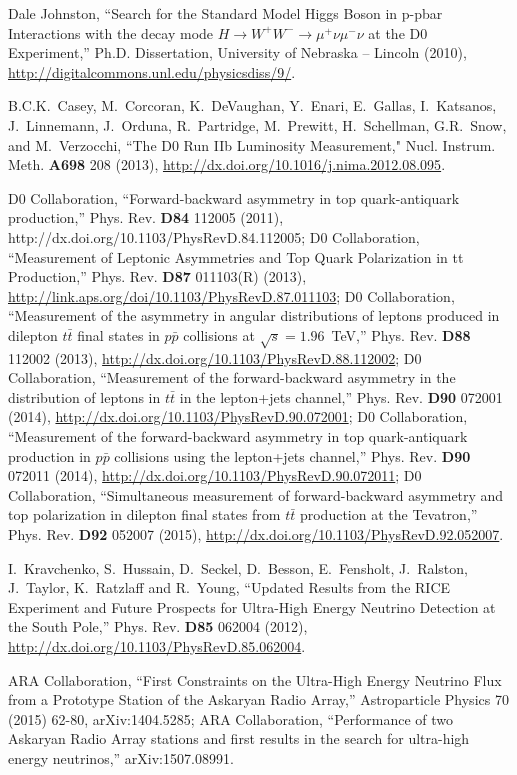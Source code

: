 \begin{thebibliography}{99}
Dale Johnston, ``Search for the Standard Model Higgs Boson in p-pbar Interactions with the decay mode $H\rightarrow W^+ W^- \rightarrow \mu^+ \nu \mu^- \nu$ at the D0 Experiment,'' Ph.D. Dissertation, University of Nebraska -- Lincoln (2010), \url{http://digitalcommons.unl.edu/physicsdiss/9/}.

 B.C.K.~Casey, M.~Corcoran, K.~DeVaughan, Y.~Enari, E.~Gallas, I.~Katsanos, J.~Linnemann, J.~Orduna, R.~Partridge, M.~Prewitt, H.~Schellman, G.R.~Snow, and M.~Verzocchi, ``The D0 Run IIb Luminosity Measurement," Nucl. Instrum. Meth. {\bf A698} 208 (2013), \url{http://dx.doi.org/10.1016/j.nima.2012.08.095}.

 D0 Collaboration, ``Forward-backward asymmetry in top quark-antiquark production,” Phys. Rev. {\bf D84} 112005 (2011), http://dx.doi.org/10.1103/PhysRevD.84.112005;
D0 Collaboration, ``Measurement of Leptonic Asymmetries and Top Quark Polarization in tt Production,'' Phys. Rev. {\bf D87} 011103(R) (2013), \url{http://link.aps.org/doi/10.1103/PhysRevD.87.011103};
D0 Collaboration, ``Measurement of the asymmetry in angular distributions of leptons produced in dilepton $t\bar{t}$ final states in $p\bar{p}$ collisions at $\sqrt{s} = 1.96$~TeV,'' Phys. Rev. {\bf D88} 112002 (2013),
\url{http://dx.doi.org/10.1103/PhysRevD.88.112002};
D0 Collaboration, ``Measurement of the forward-backward asymmetry in the distribution of leptons in $t\bar{t}$ in the lepton+jets channel,'' Phys. Rev. {\bf D90} 072001 (2014), \url{http://dx.doi.org/10.1103/PhysRevD.90.072001};
D0 Collaboration, ``Measurement of the forward-backward asymmetry in top quark-antiquark production in $p\bar{p}$ collisions using the lepton+jets channel,'' Phys. Rev. {\bf D90} 072011 (2014), \url{http://dx.doi.org/10.1103/PhysRevD.90.072011};
D0 Collaboration, ``Simultaneous measurement of forward-backward asymmetry and top polarization in dilepton final states from $t\bar{t}$ production at the Tevatron,'' Phys. Rev. {\bf D92} 052007 (2015), \url{http://dx.doi.org/10.1103/PhysRevD.92.052007}.

 I.~Kravchenko, S.~Hussain, D.~Seckel, D.~Besson,
  E.~Fensholt, J.~Ralston, J.~Taylor, K.~Ratzlaff and R.~Young, ``Updated
  Results from the RICE Experiment and Future Prospects for Ultra-High
  Energy Neutrino Detection at the South Pole,'' Phys. Rev. {\bf D85}
  062004 (2012), \url{http://dx.doi.org/10.1103/PhysRevD.85.062004}.

ARA Collaboration, ``First Constraints on the Ultra-High Energy Neutrino Flux from a Prototype Station of the Askaryan Radio Array,'' Astroparticle Physics 70 (2015) 62-80, arXiv:1404.5285;
%
ARA Collaboration, ``Performance of two Askaryan Radio Array stations and first results in the search for ultra-high energy neutrinos,'' arXiv:1507.08991.


\end{thebibliography}

